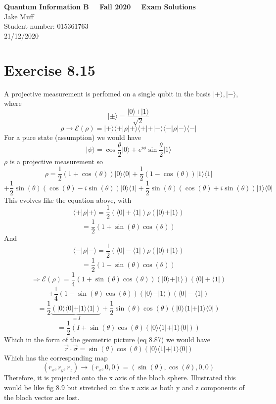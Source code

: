 \documentclass[12pt]{article}
\newcommand{\ket}[1]{\vert{#1}\rangle}
\newcommand{\bra}[1]{\langle{#1}\vert}
\begin{document}
\normalsize

\baselineskip 14pt

\begin{center}
{\Large {\bf Quantum Information B \ \ Fall 2020 \ \  Exam Solutions}}\\
{\large { Jake Muff}}\\
{Student number: 015361763}\\
{21/12/2020}
\end{center}


\section{Exercise 8.15}
A projective measurement is perfomed on a single qubit in the basis $\ket{+}, \ket{-}$, where
$$ \ket{\pm} = \frac{\ket{0} \pm \ket{1}}{\sqrt{2}} $$
$$ \rho \rightarrow \mathcal{E} (\rho) = \ket{+} \bra{+} \rho \ket{+} \bra{+} + \ket{-} \bra{-} \rho \ket{-} \bra{-}  $$
For a pure state (assumption) we would have 
$$ \ket{\psi} = \cos \frac{\theta}{2} \ket{0} + e^{i \phi} \sin \frac{\theta}{2} \ket{1} $$
$\rho$ is a projective measurement so 
$$ \rho = \frac{1}{2} (1 + \cos (\theta) ) \ket{0} \bra{0} + \frac{1}{2} (1- \cos (\theta) ) \ket{1} \bra{1} $$
$$ + \frac{1}{2} \sin (\theta) (\cos (\theta) - i \sin (\theta) ) \ket{0} \bra{1} + \frac{1}{2} \sin (\theta) (\cos (\theta) + i \sin (\theta) ) \ket{1} \bra{0} $$
This evolves like the equation above, with 
$$ \bra{+} \rho \ket{+} = \frac{1}{2} ( \bra{0} + \bra{1} ) \rho ( \ket{0} + \ket{1} ) $$
$$ = \frac{1}{2} ( 1 + \sin (\theta) \cos(\theta) ) $$
And 
$$ \bra{-} \rho \ket{-} = \frac{1}{2} ( \bra{0} - \bra{1}) \rho ( \ket{0} + \ket{1} ) $$
$$ = \frac{1}{2} ( 1- \sin (\theta) \cos(\theta) ) $$
$$ \Rightarrow \mathcal{E} (\rho) = \frac{1}{4} ( 1+ \sin(\theta) \cos (\theta) ) ( \ket{0} + \ket{1} ) ( \bra{0} + \bra{1} ) $$
$$ + \frac{1}{4} ( 1- \sin (\theta) \cos (\theta) ) ( \ket{0} - \ket{1} ) (\bra{0} - \bra{1} ) $$
$$ = \frac{1}{2} \underbrace{(\ket{0}\bra{0} + \ket{1}\bra{1} )}_{=I} + \frac{1}{2} \sin (\theta) \cos (\theta) ( \ket{0} \bra{1} + \ket{1} \bra{0} )$$
$$ = \frac{1}{2} ( I + \sin(\theta) \cos (\theta) ( \ket{0} \bra{1} + \ket{1} \bra{0} )) $$
Which in the form of the geometric picture (eq 8.87) we would have 
$$ \vec{r} \cdot \vec{\sigma} = \sin(\theta) \cos (\theta) ( \ket{0} \bra{1} + \ket{1} \bra{0} ) $$
Which has the corresponding map 
$$ (r_x, r_y, r_z) \rightarrow (r_x, 0, 0) = (\sin (\theta), \cos (\theta), 0, 0) $$
Therefore, it is projected onto the x axis of the bloch sphere. Illustrated this would be like fig 8.9 but stretched on the x axis as both y and z components of the bloch vector are lost. 
\end{document}
